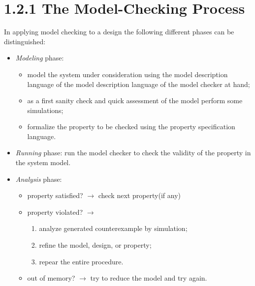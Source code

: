 \documentclass[a4paper,11pt]{article}
\begin{document}
 
\section*{1.2.1  The Model-Checking Process}
In applying model checking to a design the following different phases can be distinguished:
\begin{itemize}
\item \emph{Modeling} phase:
\begin{itemize}
\item model the system under consideration using the model description language of the model description language of the model checker at hand;
\item as a first sanity check and quick assessment of the model perform some simulations;
\item formalize the property to be checked using the property specification language.
\end{itemize}
\item \emph{Running} phase: run the model checker to check the validity of the property in the system model.
\item \emph{Analysis} phase:
\begin{itemize}
\item property satisfied? $\rightarrow$  check next property(if any)
\item property violated? $\rightarrow$
\begin{enumerate}
\item analyze generated counterexample by simulation;
\item refine the model, design, or property;
\item repear the entire procedure.
\end{enumerate}
\item out of memory? $\rightarrow$ try to reduce the model and try again.
\end{itemize}
\end{itemize}
\end{document}

